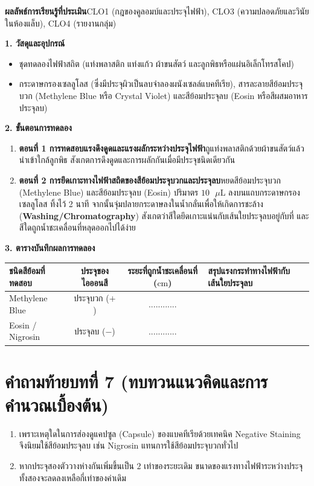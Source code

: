 \begin{labbox}
\noindent\textbf{ผลลัพธ์การเรียนรู้ที่ประเมิน}\quad CLO1 (กฎของคูลอมบ์และประจุไฟฟ้า), CLO3 (ความปลอดภัยและวินัยในห้องแล็บ), CLO4 (รายงานกลุ่ม)

\vspace{4pt}
\noindent\textbf{1. วัสดุและอุปกรณ์}
\begin{itemize}
    \item ชุดทดลองไฟฟ้าสถิต (แท่งพลาสติก แท่งแก้ว ผ้าขนสัตว์ และลูกพิธหรือแผ่นอิเล็กโทรสโคป)
    \item กระดาษกรองเซลลูโลส (ซึ่งมีประจุผิวเป็นลบจำลองผนังเซลล์แบคทีเรีย), สารละลายสีย้อมประจุบวก (Methylene Blue หรือ Crystal Violet) และสีย้อมประจุลบ (Eosin หรือสีผสมอาหารประจุลบ)
\end{itemize}

\noindent\textbf{2. ขั้นตอนการทดลอง}
\begin{enumerate}
    \item \textbf{ตอนที่ 1 การทดสอบแรงดึงดูดและแรงผลักระหว่างประจุไฟฟ้า}\quad ถูแท่งพลาสติกด้วยผ้าขนสัตว์แล้วนำเข้าใกล้ลูกพิธ สังเกตการดึงดูดและการผลักกันเมื่อมีประจุชนิดเดียวกัน
    \item \textbf{ตอนที่ 2 การยึดเกาะทางไฟฟ้าสถิตของสีย้อมประจุบวกและประจุลบ}\quad หยดสีย้อมประจุบวก (Methylene Blue) และสีย้อมประจุลบ (Eosin) ปริมาตร $10\text{ }\mu\text{L}$ ลงบนแถบกระดาษกรองเซลลูโลส ทิ้งไว้ 2 นาที จากนั้นจุ่มปลายกระดาษลงในน้ำกลั่นเพื่อให้เกิดการชะล้าง (\textbf{Washing/Chromatography}) สังเกตว่าสีใดยึดเกาะแน่นกับเส้นใยประจุลบอยู่กับที่ และสีใดถูกน้ำชะเคลื่อนที่หลุดออกไปได้ง่าย
\end{enumerate}

\noindent\textbf{3. ตารางบันทึกผลการทดลอง}
\begin{center}
\footnotesize\setlength{\tabcolsep}{3.5pt}
\begin{tabularx}{\linewidth}{>{\raggedright\arraybackslash}X c c >{\raggedright\arraybackslash}X}
\toprule
\textbf{ชนิดสีย้อมที่ทดสอบ} & \textbf{ประจุของไอออนสี} & \textbf{ระยะที่ถูกน้ำชะเคลื่อนที่ ($\text{cm}$)} & \textbf{สรุปแรงกระทำทางไฟฟ้ากับเส้นใยประจุลบ} \\
\midrule
Methylene Blue & ประจุบวก ($+$) & ............ & \dotfill \\
Eosin / Nigrosin & ประจุลบ ($-$) & ............ & \dotfill \\
\bottomrule
\end{tabularx}
\end{center}
\end{labbox}

\section*{คำถามท้ายบทที่ 7 (ทบทวนแนวคิดและการคำนวณเบื้องต้น)}
\begin{enumerate}
    \item เพราะเหตุใดในการส่องดูแคปซูล (Capsule) ของแบคทีเรียด้วยเทคนิค Negative Staining จึงนิยมใช้สีย้อมประจุลบ เช่น Nigrosin แทนการใช้สีย้อมประจุบวกทั่วไป
    \item หากประจุสองตัววางห่างกันเพิ่มขึ้นเป็น $2$ เท่าของระยะเดิม ขนาดของแรงทางไฟฟ้าระหว่างประจุทั้งสองจะลดลงเหลือกี่เท่าของค่าเดิม
\end{enumerate}
